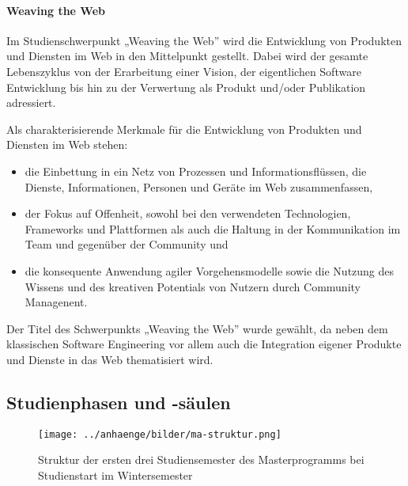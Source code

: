 \paragraph{Weaving the
Web\label{/mi-2017/selbstbericht/0400-studiengangskonzept/0000-studiengangskonzept}}\label{weaving-the-webpathlabelmi-2017selbstbericht0400-studiengangskonzept0000-studiengangskonzept}

Im Studienschwerpunkt „Weaving the Web'' wird die Entwicklung von
Produkten und Diensten im Web in den Mittelpunkt gestellt. Dabei wird
der gesamte Lebenszyklus von der Erarbeitung einer Vision, der
eigentlichen Software Entwicklung bis hin zu der Verwertung als Produkt
und/oder Publikation adressiert.

Als charakterisierende Merkmale für die Entwicklung von Produkten und
Diensten im Web stehen:

\begin{itemize}
\tightlist
\item
  die Einbettung in ein Netz von Prozessen und Informationsflüssen, die
  Dienste, Informationen, Personen und Geräte im Web zusammenfassen,
\item
  der Fokus auf Offenheit, sowohl bei den verwendeten Technologien,
  Frameworks und Plattformen als auch die Haltung in der Kommunikation
  im Team und gegenüber der Community und
\item
  die konsequente Anwendung agiler Vorgehensmodelle sowie die Nutzung
  des Wissens und des kreativen Potentials von Nutzern durch Community
  Managenent.
\end{itemize}

Der Titel des Schwerpunkts „Weaving the Web'' wurde gewählt, da neben
dem klassischen Software Engineering vor allem auch die Integration
eigener Produkte und Dienste in das Web thematisiert wird.

\subsection{Studienphasen und
-säulen\label{/mi-2017/selbstbericht/0400-studiengangskonzept/0000-studiengangskonzept}}\label{studienphasen-und--suxe4ulenpathlabelmi-2017selbstbericht0400-studiengangskonzept0000-studiengangskonzept-1}

\begin{figure}[htbp]
\centering
\texttt{[image: ../anhaenge/bilder/ma-struktur.png]}
\caption{Struktur der ersten drei Studiensemester des Masterprogramms
bei Studienstart im Wintersemester}
\end{figure}

